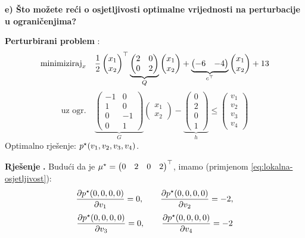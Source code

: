 \begin{zadatak}

\textbf{e) Što možete reći o osjetljivosti optimalne vrijednosti na
perturbacije u ograničenjima?}

\textbf{Perturbirani problem} :
\[
\text{minimiziraj}_x \quad
\frac{1}{2}\begin{pmatrix}x_1\\x_2\end{pmatrix}^{\top}
\underbrace{\begin{pmatrix}2&0\\0&2\end{pmatrix}}_{Q}
\begin{pmatrix}x_1\\x_2\end{pmatrix}
+ \underbrace{\begin{pmatrix}-6&-4\end{pmatrix}}_{c^{\top}}
\begin{pmatrix}x_1\\x_2\end{pmatrix} + 13
\]
\[
\text{uz ogr.}\quad
\underbrace{\begin{pmatrix}
-1 & 0 \\ 1 & 0 \\ 0 & -1 \\ 0 & 1
\end{pmatrix}}_{G}
\begin{pmatrix}x_1\\x_2\end{pmatrix}
- \underbrace{\begin{pmatrix}0\\2\\0\\1\end{pmatrix}}_{h}
\le \begin{pmatrix}v_1\\v_2\\v_3\\v_4\end{pmatrix}
\]
Optimalno rješenje: $p^{\star}(v_1,v_2,v_3,v_4)$.

\textbf{Rješenje} \textbf{.} Budući da je
$\mu^{\star} = \begin{pmatrix}0 & 2 & 0 & 2\end{pmatrix}^{\top}$, imamo (primjenom
\eqref{eq:lokalna-osjetljivost}):
\[
\frac{\partial p^{\star}(0,0,0,0)}{\partial v_1} = 0, \qquad
\frac{\partial p^{\star}(0,0,0,0)}{\partial v_2} = -2,
\]
\[
\frac{\partial p^{\star}(0,0,0,0)}{\partial v_3} = 0, \qquad
\frac{\partial p^{\star}(0,0,0,0)}{\partial v_4} = -2
\]


\end{zadatak}
